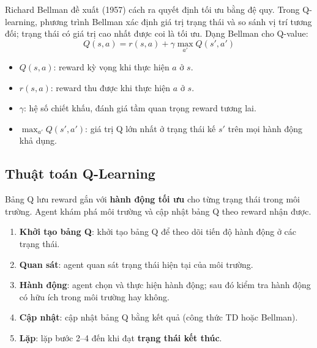 \begin{phuongphap}[title={Phương trình Bellman trong Q-Learning}]
Richard Bellman đề xuất (1957) cách ra quyết định tối ưu bằng đệ quy.
Trong Q-learning, phương trình Bellman xác định giá trị trạng thái và so sánh vị trí tương đối; trạng thái có giá trị cao nhất được coi là tối ưu.
Dạng Bellman cho Q-value:
\[
Q(s,a) = r(s,a) + \gamma \max_{a'} Q(s',a')
\]
\begin{itemize}
  \item $Q(s,a)$: reward kỳ vọng khi thực hiện $a$ ở $s$.
  \item $r(s,a)$: reward thu được khi thực hiện $a$ ở $s$.
  \item $\gamma$: hệ số chiết khấu, đánh giá tầm quan trọng reward tương lai.
  \item $\max_{a'} Q(s',a')$: giá trị Q lớn nhất ở trạng thái kế $s'$ trên mọi hành động khả dụng.
\end{itemize}
\end{phuongphap}

\subsection{Thuật toán Q-Learning}

\begin{dinhnghia}[title={Bảng Q (Q-table)}]
Bảng Q lưu reward gắn với \textbf{hành động tối ưu} cho từng trạng thái trong môi trường.
Agent khám phá môi trường và cập nhật bảng Q theo reward nhận được.
\end{dinhnghia}

\begin{phuongphap}[title={Các bước thuật toán Q-Learning}]
\begin{enumerate}
  \item \textbf{Khởi tạo bảng Q}: khởi tạo bảng Q để theo dõi tiến độ hành động ở các trạng thái.
  \item \textbf{Quan sát}: agent quan sát trạng thái hiện tại của môi trường.
  \item \textbf{Hành động}: agent chọn và thực hiện hành động; sau đó kiểm tra hành động có hữu ích trong môi trường hay không.
  \item \textbf{Cập nhật}: cập nhật bảng Q bằng kết quả (công thức TD hoặc Bellman).
  \item \textbf{Lặp}: lặp bước 2--4 đến khi đạt \textbf{trạng thái kết thúc}.
\end{enumerate}
\end{phuongphap}

